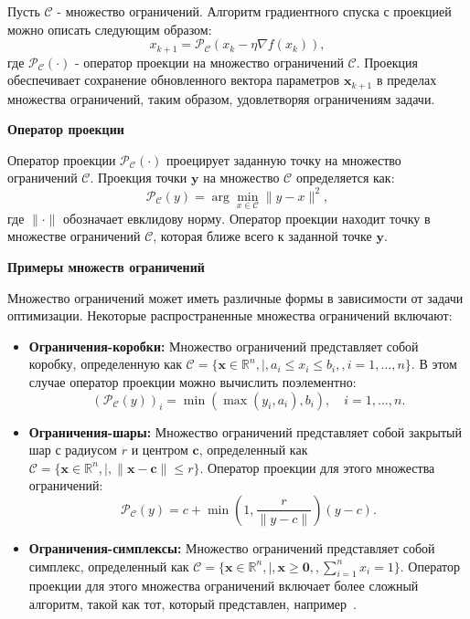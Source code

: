 Пусть $\mathcal{C}$ - множество ограничений.
Алгоритм градиентного спуска с проекцией
можно описать следующим образом:
\[ x_{k+1} = \mathcal{P}_{\mathcal{C}}(x_k - \eta \nabla f(x_k)), \]
где $\mathcal{P}_{\mathcal{C}}(\cdot)$ - оператор проекции
на множество ограничений $\mathcal{C}$.
Проекция обеспечивает сохранение обновленного
вектора параметров $\mathbf{x}_{k+1}$ в пределах множества
ограничений, таким образом, удовлетворяя ограничениям задачи.

\textbf{Оператор проекции}

Оператор проекции $\mathcal{P}_{\mathcal{C}}(\cdot)$
проецирует заданную точку на множество ограничений $\mathcal{C}$.
Проекция точки $\mathbf{y}$ на множество $\mathcal{C}$ определяется как:
\[
    \mathcal{P}_{\mathcal{C}}(y) =
    \arg \min_{x \in \mathcal{C}} \|y - x\|^2,
\]
где $\|\cdot\|$ обозначает евклидову норму.
Оператор проекции находит точку в множестве ограничений
$\mathcal{C}$, которая ближе всего к заданной точке $\mathbf{y}$.

\textbf{Примеры множеств ограничений}

Множество ограничений может иметь различные формы
в зависимости от задачи оптимизации.
Некоторые распространенные множества ограничений включают:
\begin{itemize}
    \item \textbf{Ограничения-коробки:} Множество ограничений представляет
    собой коробку, определенную как
    $\mathcal{C} = \{\mathbf{x} \in \mathbb{R}^n , | , a_i
    \leq x_i \leq b_i, , i=1,\dots,n\}.$
    В этом случае оператор проекции можно вычислить поэлементно:
    \[
        (\mathcal{P}_{\mathcal{C}}(y))_i =
        \min(\max(y_i, a_i), b_i), \quad i=1,\dots,n.
    \]

    \item \textbf{Ограничения-шары:} Множество ограничений представляет
    собой закрытый шар с радиусом $r$ и центром $\mathbf{c}$,
    определенный как $\mathcal{C} = \{\mathbf{x} \in \mathbb{R}^n , | ,
    \|\mathbf{x} - \mathbf{c}\| \leq r\}$.
    Оператор проекции для этого множества ограничений:
    \[
        \mathcal{P}_{\mathcal{C}}(y) = c
        + \min\left(1, \frac{r}{\|y-c\|}\right)(y-c).
    \]
    \item \textbf{Ограничения-симплексы:} Множество ограничений
    представляет собой симплекс, определенный как
    $\mathcal{C} = \{\mathbf{x} \in \mathbb{R}^n ,
    | , \mathbf{x} \geq \mathbf{0}, , \sum_{i=1}^n x_i = 1\}.$
    Оператор проекции для этого множества ограничений включает
    более сложный алгоритм, такой как тот,
    который представлен, например~\cite{Duchi2011}.
\end{itemize}

